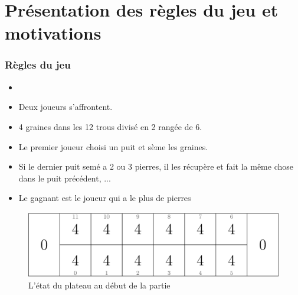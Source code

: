 \documentclass{beamer}
\begin{document}
\section{Présentation des règles du jeu et motivations}
\begin{frame}
  \frametitle{Règles du jeu}
  \begin{minipage}[t]{0.5\linewidth}
    \begin{itemize}
    \item<Règles du jeu>
    \item Deux joueurs s'affrontent.
    \item 4 graines dans les 12 trous divisé en 2 rangée de 6.
    \item Le premier joueur choisi un puit et sème les graines.
    \item Si le dernier puit semé a 2 ou 3 pierres, il les récupère et fait la même chose dans le puit précédent, ...
      \item Le gagnant est le joueur qui a le plus de pierres
    \end{itemize}
  \end{minipage}
  \hfill 
  \begin{minipage}[t]{0.49\linewidth}
    \begin{figure}
      \centering
      \includegraphics[width=1.05\linewidth]{ressources/p_debut.jpg}
      \caption{L'état du plateau au début de la partie}
    \end{figure}
    
  \end{minipage}
  
\end{frame}
\end{document}
